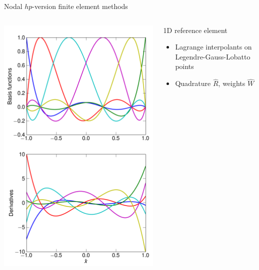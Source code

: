 \begin{frame}{Nodal $hp$-version finite element methods}
  \begin{columns}
    \begin{column}{0.4\textwidth}
      \includegraphics[width=\textwidth]{figures/lgl}
    \end{column}
    \begin{column}{0.6\textwidth}
      \begin{block}{1D reference element}
        \begin{itemize}
        \item Lagrange interpolants on Legendre-Gauss-Lobatto points
        \item Quadrature $\hat R$, weights $\hat W$

\end{itemize}
\end{block}
\end{column}
\end{columns}
\end{frame}
